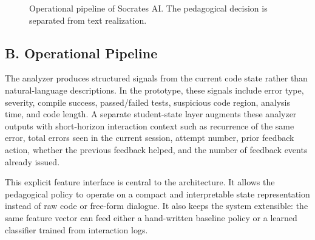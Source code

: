 ﻿\documentclass[conference]{IEEEtran}
\newcommand{\system}{Socrates AI}
\begin{document}
\begin{figure}[t]
\centering
{}
\caption{Operational pipeline of \system. The pedagogical decision is separated from text realization.}
\label{fig:architecture}
\end{figure}

\subsection*{B. Operational Pipeline}

The analyzer produces structured signals from the current code state rather than natural-language descriptions. In the prototype, these signals include error type, severity, compile success, passed/failed tests, suspicious code region, analysis time, and code length. A separate student-state layer augments these analyzer outputs with short-horizon interaction context such as recurrence of the same error, total errors seen in the current session, attempt number, prior feedback action, whether the previous feedback helped, and the number of feedback events already issued.

This explicit feature interface is central to the architecture. It allows the pedagogical policy to operate on a compact and interpretable state representation instead of raw code or free-form dialogue. It also keeps the system extensible: the same feature vector can feed either a hand-written baseline policy or a learned classifier trained from interaction logs.
\end{document}
